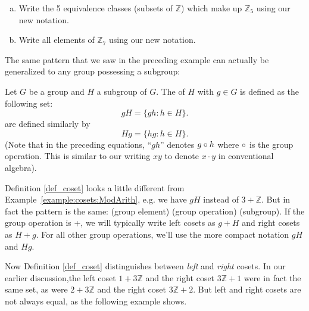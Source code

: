 \begin{exercise}{}
\begin{enumerate}[(a)]
\item
Write the 5 equivalence classes (subsets of ${\mathbb Z}$)  which make up ${\mathbb Z}_5$ using our new notation.
\item
Write all elements of ${\mathbb Z}_7$ using our new notation.
\end{enumerate}
\end{exercise}

The same pattern that we saw in the preceding example can actually be generalized to any group possessing a subgroup:

\begin{defn}\label{def_coset}
Let $G$ be a group and $H$ a subgroup of $G$.  The  of $H$ with  $g \in G$ is defined as the following set: 
\[
gH = \{ gh : h \in H \}.
\]
 are defined similarly by
\[
Hg = \{ hg : h \in H \}.
\]
(Note that in the preceding equations, ``$gh$'' denotes $g \circ h$ where $\circ$ is the group operation. This is similar to our writing $xy$ to denote $x \cdot y$ in conventional algebra).
\end{defn}

Definition \ref{def_coset} looks a little different from Example~\ref{example:cosets:ModArith}, e.g. we have $gH$ instead of  $3 + {\mathbb Z}$.  But in fact the pattern is the same:  (group element) (group operation) (subgroup).  If the group operation is +, we will typically write left cosets as $g + H$ and right cosets as $H + g$. For all other group operations, we'll use the more compact notation $gH$ and $Hg$.

Now Definition \ref{def_coset} distinguishes between  \emph{left} and \emph{right} cosets.   In our earlier discussion,the left coset $1 + 3{\mathbb Z}$ and the right coset $ 3{\mathbb Z} + 1$ were in fact the same set, as were $2 + 3{\mathbb Z}$ and the right coset $ 3{\mathbb Z} + 2$.  But left and right cosets are not always equal, as the following example shows.  

